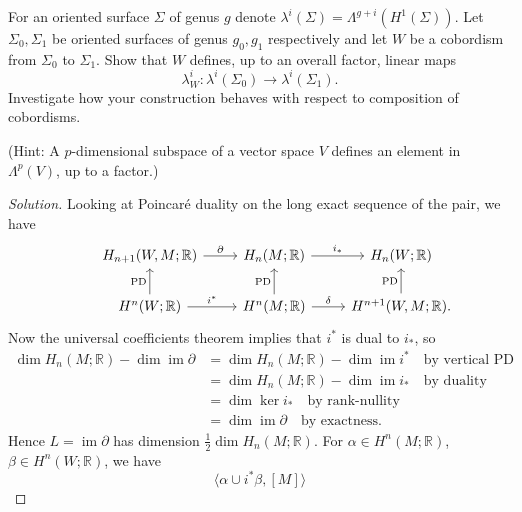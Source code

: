 \documentclass{article}
\theoremstyle{definition}
\DeclareMathOperator{\im}{im}
\newcommand{\PD}{\mathrm{PD}}
\newcommand{\R}{\mathbb{R}}
\begin{document}
\begin{enumerate}
        For an oriented surface $\Sigma$ of genus $g$ denote
        $\lambda^i(\Sigma)=\Lambda^{g+i}(H^1(\Sigma))$. Let $\Sigma_0,\Sigma_1$
        be oriented surfaces of genus $g_0,g_1$ respectively and let $W$ be a
        cobordism from $\Sigma_0$ to $\Sigma_1$. Show that $W$ defines, up to an
        overall factor, linear maps
        \begin{equation*}
            \lambda^i_W:\lambda^i(\Sigma_0)\to\lambda^i(\Sigma_1).
        \end{equation*}
        Investigate how your construction behaves with respect to composition of
        cobordisms.

        (Hint: A $p$-dimensional subspace of a vector space $V$ defines an
        element in $\Lambda^p(V)$, up to a factor.)

        \begin{proof}[Solution]
            Looking at Poincar\'e duality on the long exact sequence of the
            pair, we have
            \begin{equation*}
                \begin{tikzcd}
                    &H_{n+1}(W,M;\R) \ar[r,"\partial"]
                    &H_n(M;\R) \ar[r,"i_*"]
                    &H_n(W;\R) \\
                    &H^n(W;\R) \ar[r,"i^*"] \ar[u,"\PD"]
                    &H^n(M;\R) \ar[r,"\delta"] \ar[u,"\PD"]
                    &H^{n+1}(W,M;\R). \ar[u,"\PD"]
                \end{tikzcd}
            \end{equation*}
            Now the universal coefficients theorem implies that $i^*$ is dual to
            $i_*$, so
            \begin{align*}
                \dim H_n(M;\R) - \dim\im\partial
                    &= \dim H_n(M;\R) - \dim\im i^* \quad \text{by vertical PD} \\
                    &= \dim H_n(M;\R) - \dim\im i_* \quad \text{by duality} \\
                    &= \dim\ker i_* \quad \text{by rank-nullity} \\
                    &= \dim\im\partial \quad \text{by exactness.}
            \end{align*}
            Hence $L=\im\partial$ has dimension $\frac{1}{2}\dim H_n(M;\R)$. For
            $\alpha\in H^n(M;\R)$, $\beta\in H^n(W;\R)$, we have
            \begin{equation*}
                \langle\alpha\cup i^*\beta,[M]\rangle

\end{equation*}
\end{proof}
\end{enumerate}
\end{document}
